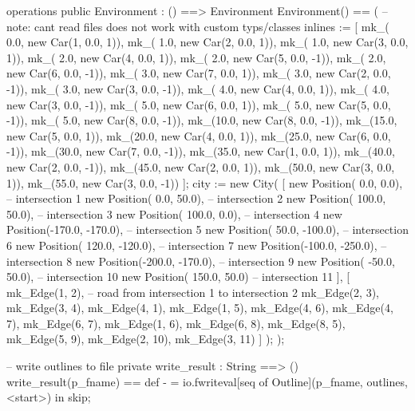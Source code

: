 \documentclass[a4paper]{article}
\begin{document}
\begin{vdm_al}
operations
    public Environment : () ==> Environment
    Environment() == (
        -- note: cant read files does not work with custom typs/classes
        inlines := [
            mk_( 0.0, new Car(1, 0.0,  1)),
            mk_( 1.0, new Car(2, 0.0,  1)),
            mk_( 1.0, new Car(3, 0.0,  1)),
            mk_( 2.0, new Car(4, 0.0,  1)),
            mk_( 2.0, new Car(5, 0.0, -1)),
            mk_( 2.0, new Car(6, 0.0, -1)),
            mk_( 3.0, new Car(7, 0.0,  1)),
            mk_( 3.0, new Car(2, 0.0, -1)),
            mk_( 3.0, new Car(3, 0.0, -1)),
            mk_( 4.0, new Car(4, 0.0,  1)),
            mk_( 4.0, new Car(3, 0.0, -1)),
            mk_( 5.0, new Car(6, 0.0,  1)),
            mk_( 5.0, new Car(5, 0.0, -1)),
            mk_( 5.0, new Car(8, 0.0, -1)),
            mk_(10.0, new Car(8, 0.0, -1)),
            mk_(15.0, new Car(5, 0.0,  1)),
            mk_(20.0, new Car(4, 0.0,  1)),
            mk_(25.0, new Car(6, 0.0, -1)),
            mk_(30.0, new Car(7, 0.0, -1)),
            mk_(35.0, new Car(1, 0.0,  1)),
            mk_(40.0, new Car(2, 0.0, -1)),
            mk_(45.0, new Car(2, 0.0,  1)),
            mk_(50.0, new Car(3, 0.0,  1)),
            mk_(55.0, new Car(3, 0.0, -1))
        ];
        city := new City(
            [
                new Position(   0.0,    0.0), -- intersection 1
                new Position(   0.0,   50.0), -- intersection 2
                new Position( 100.0,   50.0), -- intersection 3
                new Position( 100.0,    0.0), -- intersection 4
                new Position(-170.0, -170.0), -- intersection 5
                new Position(  50.0, -100.0), -- intersection 6
                new Position( 120.0, -120.0), -- intersection 7
                new Position(-100.0, -250.0), -- intersection 8
                new Position(-200.0, -170.0), -- intersection 9
                new Position( -50.0,   50.0), -- intersection 10
                new Position( 150.0,   50.0)  -- intersection 11
            ],
            [
                mk_Edge(1, 2), -- road from intersection 1 to intersection 2
                mk_Edge(2, 3),
                mk_Edge(3, 4),
                mk_Edge(4, 1),
                mk_Edge(1, 5),
                mk_Edge(4, 6),
                mk_Edge(4, 7),
                mk_Edge(6, 7),
                mk_Edge(1, 6),
                mk_Edge(6, 8),
                mk_Edge(8, 5),
                mk_Edge(5, 9),
                mk_Edge(2, 10),
                mk_Edge(3, 11)
            ]
        );
    );

    -- write outlines to file
    private write_result : String ==> ()
    write_result(p_fname) ==
        def - = io.fwriteval[seq of Outline](p_fname, outlines, <start>) in skip;
    

\end{vdm_al}
\end{document}
